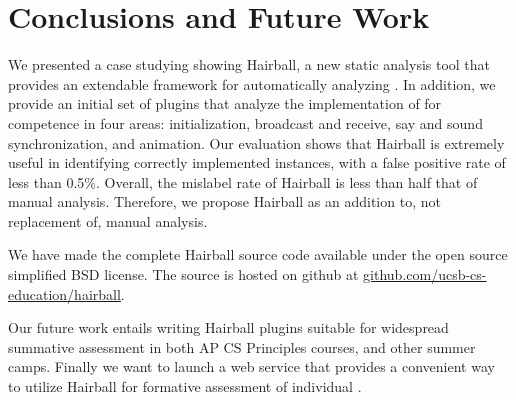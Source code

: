 \section{Conclusions and Future Work} 

We presented a case studying showing Hairball, a new static analysis tool that
provides an extendable framework for automatically analyzing .  In
addition, we provide an initial set of plugins that analyze the implementation
of  for competence in four areas: initialization, broadcast and
receive, say and sound synchronization, and animation.  Our evaluation shows
that Hairball is extremely useful in identifying correctly implemented
instances, with a false positive rate of less than 0.5\%.  Overall, the
mislabel rate of Hairball is less than half that of manual analysis.
Therefore, we propose Hairball as an addition to, not replacement of, manual
analysis.

We have made the complete Hairball source code available under the open source
simplified BSD license. The source is hosted on github at
\url{github.com/ucsb-cs-education/hairball}.

Our future work entails writing Hairball plugins suitable for wide\-spread
summative assessment in both AP CS Principles courses, and other summer
camps. Finally we want to launch a web service that provides a convenient way
to utilize Hairball for formative assessment of individual .
